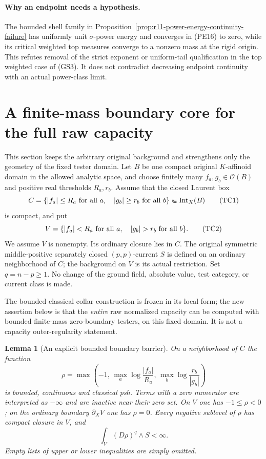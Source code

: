 \documentclass[11pt,a4paper]{article}
\numberwithin{equation}{section}
\newtheorem{lemma}[theorem]{Lemma}
\theoremstyle{definition}
\theoremstyle{remark}
\begin{document}
\paragraph{Why an endpoint needs a hypothesis.}
The bounded shell family in
Proposition~\ref{prop:r11-power-energy-continuity-failure}
has uniformly unit $\sigma$-power energy and converges
in (PE16) to zero, while its critical weighted top
measures converge to a nonzero mass at the rigid
origin. This refutes removal of the strict exponent
or uniform-tail qualification in the top weighted
case of (GS3). It does not contradict decreasing
endpoint continuity with an actual power-class limit.



\section{A finite-mass boundary core for the full raw capacity}
\label{sec:r11-finite-mass-tester-core}

This section keeps the arbitrary original background and strengthens
only the geometry of the fixed tester domain. Let $B$ be one compact
original $K$-affinoid domain in the allowed analytic space, and choose
finitely many $f_a,g_b\in\mathcal O(B)$ and positive real thresholds
$R_a,r_b$. Assume that the closed Laurent box
\[
 C=\{|f_a|\leq R_a\ \hbox{for all }a,\quad
                       |g_b|\geq r_b\ \hbox{for all }b\}
                 \Subset\operatorname{Int}_X(B)
 \tag{TC1}
\]
is compact, and put
\[
 V=\{|f_a|<R_a\ \hbox{for all }a,\quad
                       |g_b|>r_b\ \hbox{for all }b\}.
 \tag{TC2}
\]
We assume $V$ is nonempty. Its ordinary closure lies in $C$.
The original symmetric middle-positive separately closed
$(p,p)$-current $S$ is defined on an ordinary neighborhood of $C$;
the background on $V$ is its actual restriction. Set $q=n-p\geq1$.
No change of the ground field, absolute value, test category,
or current class is made.

The bounded classical collar construction is frozen in its local
form; the new assertion below is that the \emph{entire} raw normalized
capacity can be computed with bounded finite-mass zero-boundary
testers, on this fixed domain. It is not a capacity outer-regularity
statement.

\begin{lemma}[An explicit bounded boundary barrier]
\label{lem:r11-strict-Laurent-barrier}
On a neighborhood of $C$ the function
\[
 \rho=\max\left(-1,\,
       \max_a\log\frac{|f_a|}{R_a},\,
       \max_b\log\frac{r_b}{|g_b|}\right)
 \tag{TC3}
\]
is bounded, continuous and classical psh. Terms with a zero numerator
are interpreted as $-\infty$ and are inactive near their zero set.
On $V$ one has $-1\leq\rho<0$; on the ordinary boundary
$\partial_XV$ one has $\rho=0$. Every negative sublevel of $\rho$
has compact closure in $V$, and
\[
                          \int_V(D\rho)^q\wedge S<\infty.
 \tag{TC4}
\]
Empty lists of upper or lower inequalities are simply omitted.
\end{lemma}
\end{document}
